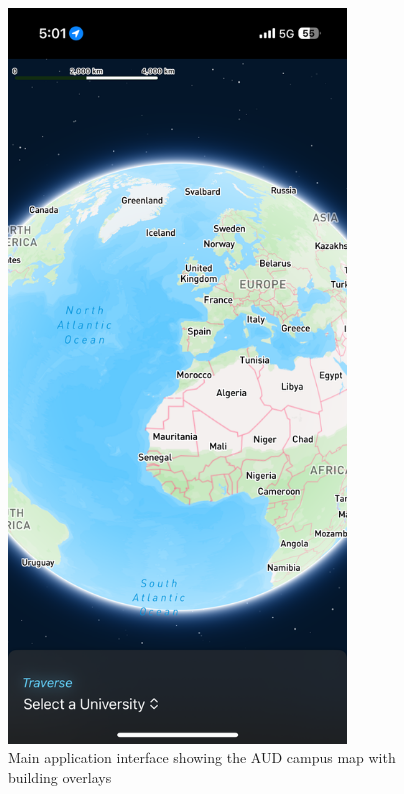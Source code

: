 \documentclass{article}
\begin{document}
\begin{figure}[h]
    \centering
    \includegraphics[width=0.8\textwidth]{figures/main-screen.png}
    \caption{Main application interface showing the AUD campus map with building overlays}
    \label{fig:main-screen}
\end{figure}
\end{document}
